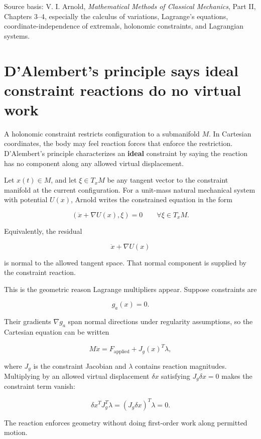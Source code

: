 Source basis: V. I. Arnold, \emph{Mathematical Methods of Classical Mechanics}, Part II, Chapters 3--4, especially the calculus of variations, Lagrange's equations, coordinate-independence of extremals, holonomic constraints, and Lagrangian systems.

\section{D'Alembert's principle says ideal constraint reactions do no virtual work}\label{02-foundations-ii-ch039-dalemberts-principle-says-ideal-constraint-reactions-do-no-virtual-work}

A holonomic constraint restricts configuration to a submanifold \(M\). In Cartesian coordinates, the body may feel reaction forces that enforce the restriction. D'Alembert's principle characterizes an \textbf{ideal} constraint by saying the reaction has no component along any allowed virtual displacement.

Let \(x(t)\in M\), and let \(\xi\in T_xM\) be any tangent vector to the constraint manifold at the current configuration. For a unit-mass natural mechanical system with potential \(U(x)\), Arnold writes the constrained equation in the form

\[
\left(
\ddot x+\nabla U(x),
\xi
\right)
=
0
\qquad
\forall \xi\in T_xM.
\]

Equivalently, the residual

\[
\ddot x+\nabla U(x)
\]

is normal to the allowed tangent space. That normal component is supplied by the constraint reaction.

This is the geometric reason Lagrange multipliers appear. Suppose constraints are

\[
g_a(x)=0.
\]

Their gradients \(\nabla g_a\) span normal directions under regularity assumptions, so the Cartesian equation can be written

\[
M\ddot x
=
F_{\mathrm{applied}}
+
J_g(x)^T\lambda,
\]

where \(J_g\) is the constraint Jacobian and \(\lambda\) contains reaction magnitudes. Multiplying by an allowed virtual displacement \(\delta x\) satisfying \(J_g\delta x=0\) makes the constraint term vanish:

\[
\delta x^T J_g^T\lambda
=
(J_g\delta x)^T\lambda
=
0.
\]

The reaction enforces geometry without doing first-order work along permitted motion.

